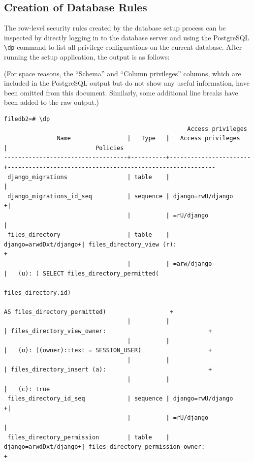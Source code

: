 \documentclass[12pt]{report}
\begin{document}
\begin{landscape}
  \section{Creation of Database Rules}
  The row-level security rules created by the database setup process can be inspected by directly logging in to the database server and using the PostgreSQL \verb+\dp+ command to list all privilege configurations on the current database. After running the setup application, the output is as follows:

  (For space reasons, the ``Schema'' and ``Column privileges'' columns, which are included in the PostgreSQL output but do not show any useful information, have been omitted from this document. Similarly, some additional line breaks have been added to the raw output.)
  {\footnotesize
\begin{verbatim}
filedb2=# \dp
                                                    Access privileges
               Name                |   Type   |   Access privileges   |                         Policies
-----------------------------------+----------+-----------------------+-----------------------------------------------------------
 django_migrations                 | table    |                       |
 django_migrations_id_seq          | sequence | django=rwU/django    +|
                                   |          | =rU/django            |
 files_directory                   | table    | django=arwdDxt/django+| files_directory_view (r):                               +
                                   |          | =arw/django           |   (u): ( SELECT files_directory_permitted(
                                                                                 files_directory.id)
                                                                                 AS files_directory_permitted)                  +
                                   |          |                       | files_directory_view_owner:                             +
                                   |          |                       |   (u): ((owner)::text = SESSION_USER)                   +
                                   |          |                       | files_directory_insert (a):                             +
                                   |          |                       |   (c): true
 files_directory_id_seq            | sequence | django=rwU/django    +|
                                   |          | =rU/django            |
 files_directory_permission        | table    | django=arwdDxt/django+| files_directory_permission_owner:                       +

\end{verbatim}}
\end{landscape}
\end{document}
